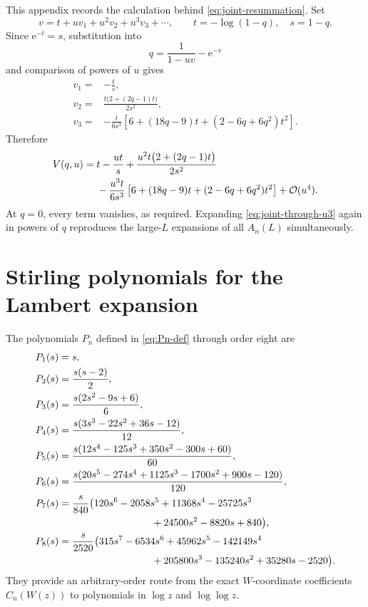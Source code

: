 \documentclass[11pt,a4paper]{article}
\numberwithin{equation}{section}
\theoremstyle{definition}
\theoremstyle{remark}
\newcommand{\e}{\mathrm e}
\newcommand{\Ord}{\mathcal O}
\newcommand{\Acoef}{A}
\newcommand{\Ccoef}{C}
\begin{document}
This appendix records the calculation behind
\eqref{eq:joint-resummation}.  Set
\begin{equation}\label{eq:appendix-v-u-ansatz}
  v=t+uv_1+u^2v_2+u^3v_3+\cdots,
  \qquad t=-\log(1-q),\quad s=1-q.
\end{equation}
Since \(\e^{-t}=s\), substitution into
\[
  q=\frac1{1-uv}-\e^{-v}
\]
and comparison of powers of \(u\) gives
\begin{align}
 v_1={}&-\frac{t}{s},
 \label{eq:v1-joint}\\
 v_2={}&\frac{t\bigl(2+(2q-1)t\bigr)}{2s^2},
 \label{eq:v2-joint}\\
 v_3={}&-\frac{t}{6s^3}
 \left[
 6+(18q-9)t+(2-6q+6q^2)t^2
 \right].
 \label{eq:v3-joint}
\end{align}
Therefore
\begin{align}
 V(q,u)={}&t-\frac{ut}{s}
 +\frac{u^2t\bigl(2+(2q-1)t\bigr)}{2s^2}
 \notag\\
 &-\frac{u^3t}{6s^3}
 \left[6+(18q-9)t+(2-6q+6q^2)t^2\right]
 +\Ord(u^4).
 \label{eq:joint-through-u3}
\end{align}
At \(q=0\), every term vanishes, as required.  Expanding
\eqref{eq:joint-through-u3} again in powers of \(q\) reproduces the
large-\(L\) expansions of all \(\Acoef_n(L)\) simultaneously.

\section{Stirling polynomials for the Lambert expansion}

The polynomials \(P_n\) defined in \eqref{eq:Pn-def} through order eight
are
\begin{align*}
 P_1(s)={}&s,\\
 P_2(s)={}&\frac{s(s-2)}2,\\
 P_3(s)={}&\frac{s(2s^2-9s+6)}6,\\
 P_4(s)={}&\frac{s(3s^3-22s^2+36s-12)}{12},\\
 P_5(s)={}&\frac{s(12s^4-125s^3+350s^2-300s+60)}{60},\\
 P_6(s)={}&\frac{s(20s^5-274s^4+1125s^3-1700s^2+900s-120)}{120},\\
 P_7(s)={}&\frac{s}{840}
 \bigl(120s^6-2058s^5+11368s^4-25725s^3\\
 &\hspace{28mm}{}+24500s^2-8820s+840\bigr),\\
 P_8(s)={}&\frac{s}{2520}
 \bigl(315s^7-6534s^6+45962s^5-142149s^4\\
 &\hspace{28mm}{}+205800s^3-135240s^2+35280s-2520\bigr).
\end{align*}
They provide an arbitrary-order route from the exact \(W\)-coordinate
coefficients \(\Ccoef_n(W(z))\) to polynomials in
\(\log z\) and \(\log\log z\).
\end{document}
